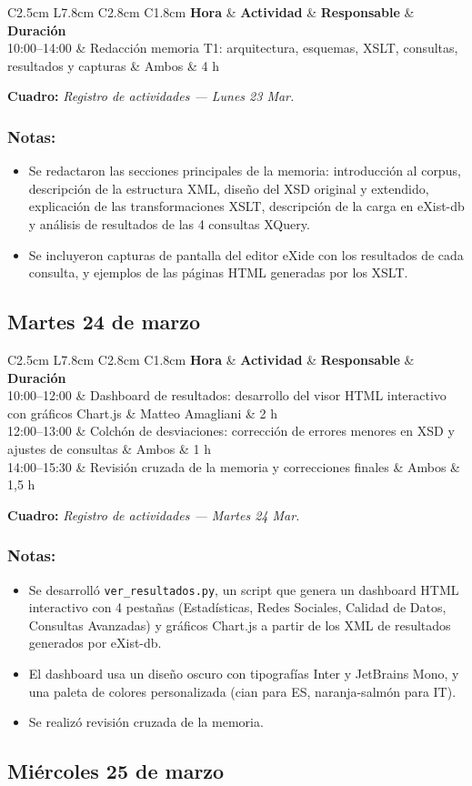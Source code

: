 \documentclass[11pt,a4paper]{article}
\newcommand{\notetitle}[1]{\subsubsection*{#1}}
\newcommand{\activitytable}[2]{%
  \begin{center}
  \begin{tabular}{C{2.5cm} L{7.8cm} C{2.8cm} C{1.8cm}}
  \toprule
  \rowcolor{white}
  \textbf{Hora} & \textbf{Actividad} & \textbf{Responsable} & \textbf{Duración} \\
  \midrule
  #1
  \bottomrule
  \end{tabular}
  \end{center}
  \vspace{-4pt}
  {\small\textbf{Cuadro:} \textit{#2}}
  \vspace{6pt}
}
\begin{document}
\activitytable{%
  10:00--14:00 & Redacción memoria T1: arquitectura, esquemas, XSLT, consultas, resultados y capturas & Ambos & 4 h \\
}{Registro de actividades --- Lunes 23 Mar.}

\notetitle{Notas:}
\begin{itemize}
  \item Se redactaron las secciones principales de la memoria: introducción al corpus, descripción de la estructura XML, diseño del XSD original y extendido, explicación de las transformaciones XSLT, descripción de la carga en eXist-db y análisis de resultados de las 4 consultas XQuery.
  \item Se incluyeron capturas de pantalla del editor eXide con los resultados de cada consulta, y ejemplos de las páginas HTML generadas por los XSLT.
\end{itemize}

\subsection{Martes 24 de marzo}

\activitytable{%
  10:00--12:00 & Dashboard de resultados: desarrollo del visor HTML interactivo con gráficos Chart.js & Matteo Amagliani & 2 h \\
  \rowcolor{tablegray}
  12:00--13:00 & Colchón de desviaciones: corrección de errores menores en XSD y ajustes de consultas & Ambos & 1 h \\
  14:00--15:30 & Revisión cruzada de la memoria y correcciones finales & Ambos & 1,5 h \\
}{Registro de actividades --- Martes 24 Mar.}

\notetitle{Notas:}
\begin{itemize}
  \item Se desarrolló \texttt{ver\_resultados.py}, un script que genera un dashboard HTML interactivo con 4 pestañas (Estadísticas, Redes Sociales, Calidad de Datos, Consultas Avanzadas) y gráficos Chart.js a partir de los XML de resultados generados por eXist-db.
  \item El dashboard usa un diseño oscuro con tipografías Inter y JetBrains Mono, y una paleta de colores personalizada (cian para ES, naranja-salmón para IT).
  \item Se realizó revisión cruzada de la memoria.
\end{itemize}

\subsection{Miércoles 25 de marzo}
\end{document}

